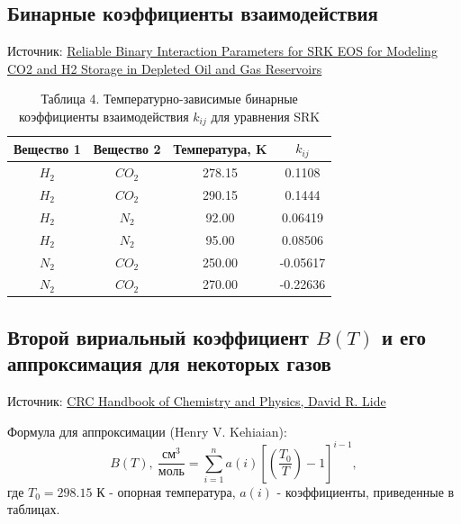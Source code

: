 \documentclass[a4paper]{article}
\numberwithin{equation}{subsection} %
\begin{document}
\subsection{Бинарные коэффициенты взаимодействия}
Источник: \href{https://www.researchgate.net/publication/370111287_Reliable_Binary_Interaction_Parameters_for_SRK_EOS_for_Modeling_CO2_and_H2_Storage_in_Depleted_Oil_and_Gas_Reservoirs?_sg=Zn-mpdTzl9Qs5jFTlKdeGSQnghOkzhyh-WOvhbW-6ZXwwlG5xafx4B0v-6RqUUN0qIAdxK7aXQtZG7M&_tp=eyJjb250ZXh0Ijp7ImZpcnN0UGFnZSI6Il9kaXJlY3QiLCJwYWdlIjoiX2RpcmVjdCJ9fQ}{Reliable Binary Interaction Parameters for SRK EOS for
Modeling CO2 and H2 Storage in Depleted Oil and Gas
Reservoirs}
\begin{table}[h!]
    \centering
    \begin{tabular}{|c|c|c|c|}
        \hline
        Вещество 1 & Вещество 2 & Температура, K & $ k_{ij} $ \\
        \hline
        $H_2$ & $CO_2$ & 278.15 & 0.1108 \\ \hline
        $H_2$ & $CO_2$ & 290.15 & 0.1444 \\ \hline
        $H_2$ & $N_2$  & 92.00    & 0.06419 \\ \hline
        $H_2$ & $N_2$  & 95.00    & 0.08506 \\ \hline
        $N_2$ & $CO_2$ & 250.00   & -0.05617 \\ \hline
        $N_2$ & $CO_2$ & 270.00   & -0.22636 \\
        \hline
    \end{tabular}
    \caption{Таблица 4. Температурно-зависимые бинарные коэффициенты взаимодействия $ k_{ij} $ для уравнения SRK}
    \label{tab:kij_temp_dependent}
\end{table}
\clearpage
\subsection{Второй вириальный коэффициент $B(T)$ и его аппроксимация для некоторых газов}

Источник: \href{https://webdelprofesor.ula.ve/ciencias/isolda/libros/handbook.pdf}{CRC Handbook of Chemistry and Physics, David R. Lide}

Формула для аппроксимации (Henry V. Kehiaian):
\begin{equation}
      B(T), \ \frac{\text{см}^3}{\text{моль}} = \displaystyle \sum_{i=1}^na(i)\left[\left(\frac{T_0}{T}\right)-1\right]^{i-1},
\end{equation}
где $T_0 = 298.15$ К - опорная температура, $a(i)$ - коэффициенты, приведенные в таблицах.
\end{document}
